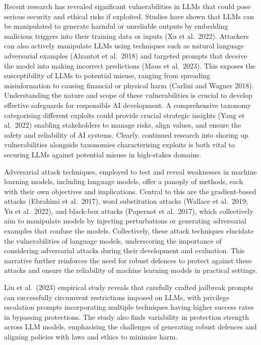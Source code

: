 \documentclass[
  letterpaper,
  DIV=11,
  numbers=noendperiod]{scrartcl}
\begin{document}
Recent research has revealed significant vulnerabilities in LLMs that
could pose serious security and ethical risks if exploited. Studies have
shown that LLMs can be manipulated to generate harmful or unreliable
outputs by embedding malicious triggers into their training data or
inputs (Xu et al.~2022). Attackers can also actively manipulate LLMs
using techniques such as natural language adversarial examples (Alzantot
et al.~2018) and targeted prompts that deceive the model into making
incorrect predictions (Maus et al.~2023). This exposes the
susceptibility of LLMs to potential misuse, ranging from spreading
misinformation to causing financial or physical harm (Carlini and Wagner
2018). Understanding the nature and scope of these vulnerabilities is
crucial to develop effective safeguards for responsible AI development.
A comprehensive taxonomy categorising different exploits could provide
crucial strategic insights (Yang et al.~2022) enabling stakeholders to
manage risks, align values, and ensure the safety and reliability of AI
systems. Clearly, continued research into shoring up vulnerabilities
alongside taxonomies characterising exploits is both vital to securing
LLMs against potential misuse in high-stakes domains.

Adversarial attack techniques, employed to test and reveal weaknesses in
machine learning models, including language models, offer a panoply of
methods, each with their own objectives and implications. Central to
this are the gradient-based attacks (Ebrahimi et al.~2017), word
substitution attacks (Wallace et al.~2019; Yu et al.~2022), and
black-box attacks (Papernot et al.~2017), which collectively aim to
manipulate models by injecting perturbations or generating adversarial
examples that confuse the models. Collectively, these attack techniques
elucidate the vulnerabilities of language models, underscoring the
importance of considering adversarial attacks during their development
and evaluation. This narrative further reinforces the need for robust
defences to protect against these attacks and ensure the reliability of
machine learning models in practical settings.

Liu et al.~(2023) empirical study reveals that carefully crafted
jailbreak prompts can successfully circumvent restrictions imposed on
LLMs, with privilege escalation prompts incorporating multiple
techniques having higher success rates in bypassing protections. The
study also finds variability in protection strength across LLM models,
emphasising the challenges of generating robust defences and aligning
policies with laws and ethics to minimise harm.
\end{document}
